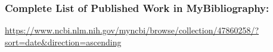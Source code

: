 \documentclass{nihbiosketch}
\begin{document}
\subsubsection*{Complete List of Published Work in MyBibliography:}
\url{https://www.ncbi.nlm.nih.gov/myncbi/browse/collection/47860258/?sort=date&direction=ascending}


\end{document}
